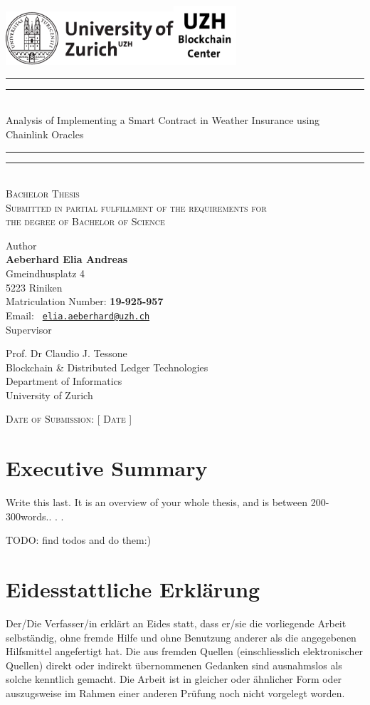 \documentclass[11pt,a4paper,english,oneside]{book}
\makeatletter
\newcommand*{\uzhlogo}{\includegraphics[height=2cm]{Logo-UZH-black}}
\newcommand*{\bcclogo}{\includegraphics[height=2.2cm]{Logo-BCC-black}}
\newcommand*{\titleGP}{\begingroup %
\centering %
\vspace*{\baselineskip} %
\uzhlogo\hspace{8cm}\bcclogo\\[2\baselineskip] %

\rule{\textwidth}{1.6pt}\vspace*{-\baselineskip}\vspace*{2pt} %
\rule{\textwidth}{0.4pt}\\[\baselineskip] %
{\LARGE \sc Analysis of Implementing a Smart Contract in Weather Insurance using Chainlink Oracles}\\[0.2\baselineskip] %
\rule{\textwidth}{0.4pt}\vspace*{-\baselineskip}\vspace{3.2pt} %
\rule{\textwidth}{1.6pt}\\[2\baselineskip] %
\scshape %
Bachelor Thesis\\[2\baselineskip]
Submitted in partial fulfillment of the requirements for \\ the degree of Bachelor of Science \par
\vspace*{2\baselineskip}
Author\\
{\Large \textbf{Aeberhard Elia Andreas} \\ [8pt]
 }
Gmeindhusplatz 4 \\ 5223 Riniken \\[5pt]
Matriculation Number: \textbf{19-925-957}\\[8pt]
 Email: \texttt{ \href{mailto:elia.aeberhard@uzh.ch} {elia.aeberhard@uzh.ch} }  \\


\vspace*{2\baselineskip}
Supervisor\\
{\Large Prof. Dr Claudio J. Tessone\\[8pt]
\small Blockchain \& Distributed Ledger Technologies\\[5pt]Department of Informatics \\[8pt]University of Zurich\par}
\vspace*{2\baselineskip}

\vfill
{\scshape Date of Submission: [ Date ]} \\[0.3\baselineskip]
\endgroup}
\makeatother
\begin{document}
\thispagestyle{empty}
\titleGP
\newpage
\onehalfspacing
\setcounter{page}{1}

\section*{Executive Summary}
\thispagestyle{firststyle}
Write  this  last.   It  is  an  overview  of  your  whole  thesis,  and  is  between  200-300words.. . .

TODO: find todos and do them:)


\tableofcontents
\listoffigures
\listoftables
\newpage
{}








\newpage

\appendix
\noappendicestocpagenum
\addappheadtotoc

\renewcommand{\theequation}{A.\arabic{equation}}

%
%

\printbibliography

\newpage
\thispagestyle{firststyle}
\section*{Eidesstattliche Erklärung}
Der/Die Verfasser/in erklärt an Eides statt, dass er/sie die vorliegende Arbeit selbständig, ohne fremde Hilfe und ohne Benutzung anderer als die angegebenen Hilfsmittel angefertigt hat. Die aus fremden Quellen (einschliesslich elektronischer Quellen) direkt oder indirekt übernommenen Gedanken sind ausnahmslos als solche kenntlich gemacht. Die Arbeit ist in gleicher oder ähnlicher Form oder auszugsweise im Rahmen einer anderen Prüfung noch nicht vorgelegt worden.\\[2cm]
 \hfill {}
\end{document}

